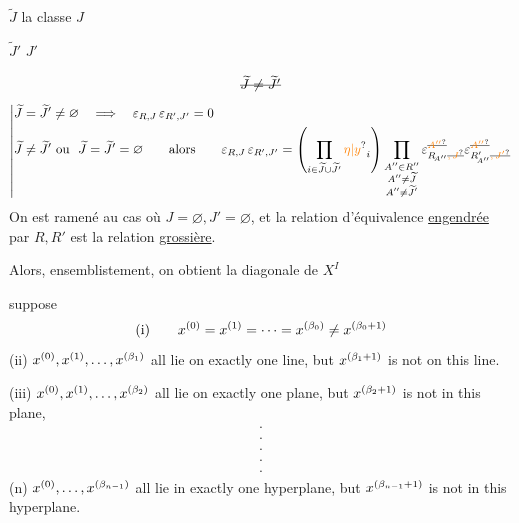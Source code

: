 $\widetilde J$ la classe  $J$

$\widetilde J'$  $J'$

\[
 \deleted{\widetilde J\ne\widetilde J'}
\]
\[
\left|\begin{aligned}
 &\widetilde J=\widetilde J'\ne\varnothing\quad\Longrightarrow\quad\varepsilon_{R,J}\,\varepsilon_{R',J'}=0\\
 &\widetilde J\ne\widetilde J'\ \text{ou }\ \widetilde J=\widetilde J'=\varnothing\qquad\text{alors}\qquad
 \varepsilon_{R,J}\,\varepsilon_{R',J'}=
 \left(\prod_{i\in\widetilde J\cup\widetilde J'}\unsure{\eta|y}_i\right)
 \prod_{\substack{A''\in R''\\A''\ne\widetilde J\\A''\ne\widetilde J'}}
 \varepsilon^{\deleted{\unsure{A''}}}_{R_{\!A''}\deleted{\unsure{,J}}}
 \varepsilon^{\deleted{\unsure{A''}}}_{R'_{\!A''}\deleted{\unsure{,J'}}}
\end{aligned}\right.
\]
On est ramené au cas où $J=\varnothing,J'=\varnothing$,
et la relation d'équivalence \uline{engendrée} par $R,R'$ est la relation \uline{grossière}.

Alors, ensemblistement, on obtient la diagonale de $X^I$

suppose
\[
 \text{(i)}\qquad x^{(0)}=x^{(1)}=\cdots=x^{(\beta_0)}\ne x^{(\beta_0+1)}
\]
(ii) $x^{(0)},x^{(1)},\ldots,x^{(\beta_1)}$ all lie on exactly one line, but
$x^{(\beta_1+1)}$ is not on this line.

(iii) $x^{(0)},x^{(1)},\ldots,x^{(\beta_2)}$ all lie on exactly one plane, but
$x^{(\beta_2+1)}$ is not in this plane,
\[
\substack{\cdot\\\cdot\\\cdot\\\cdot\\\cdot}
\]
(n) $x^{(0)},\ldots,x^{(\beta_{n-1})}$ all lie in exactly one hyperplane, but
$x^{(\beta_{n-1}+1)}$ is not in this hyperplane.

